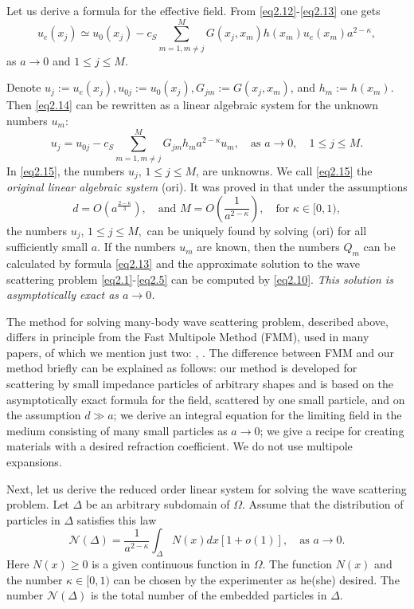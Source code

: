 \documentclass[12pt]{elsarticle}
\numberwithin{equation}{section}
\newcommand{\be}{\begin{equation}}
\newcommand{\ee}{\end{equation}}
\begin{document}
Let us derive a formula for the effective field. From \eqref{eq2.12}-\eqref{eq2.13} one gets
\be \label{eq2.14}
    u_e(x_j) \simeq u_0(x_j)-c_S\sum_{m=1, m \neq j}^M G(x_j,x_m)h(x_m)u_e(x_m)a^{2-\kappa},
\ee
as $a \to 0$ and $1 \leq j \leq M$.

Denote $u_j:=u_e(x_j),  u_{0j}:=u_0(x_j), G_{jm}:=G(x_j,x_m)$, and $h_m:=h(x_m)$. Then \eqref{eq2.14} can be rewritten as
a linear algebraic system for the unknown numbers $u_m$:
\be \label{eq2.15}
    u_j = u_{0j}-c_S\sum_{m=1, m \neq j}^M G_{jm} h_m a^{2-\kappa} u_m, \quad\text{as } a \to 0, \quad 1 \leq j \leq M.
\ee
In \eqref{eq2.15}, the numbers $u_j$, $1 \le j \le M$, are unknowns. We call \eqref{eq2.15} the  \textit{original linear algebraic system} (ori). It was proved in \citet{R635} that under the assumptions
\be \label{eq2.16}
    d=O\left(a^{\frac{2-\kappa}{3}}\right), \quad\text{and } M=O\left(\frac{1}{a^{2-\kappa}}\right), \quad\text{for } \kappa \in [0,1),
\ee
the numbers $u_j$, $1 \leq j \leq M,$ can be uniquely found by solving (ori) for all sufficiently small $a$. If the numbers $u_m$ are known,
then the numbers $Q_m$ can be calculated by formula \eqref{eq2.13} and the approximate solution to the wave scattering problem \eqref{eq2.1}-\eqref{eq2.5} can be computed by \eqref{eq2.10}. {\em This solution is asymptotically exact as $a \to 0$.}

The method for solving many-body wave scattering problem, described above, differs in principle from the 
Fast Multipole Method (FMM), used in many papers, of which we mention just two: \cite{GR1987}, \cite{GR1997}.
The difference between FMM and our method briefly can be explained as follows: our method is developed
for scattering by small impedance particles of arbitrary shapes and is based on the asymptotically exact
formula for the field, scattered by one small particle, and on the assumption $d \gg a$; we derive
an integral equation for the limiting field in the medium consisting of many small particles as $a\to 0$;
we give a recipe for creating materials with a desired refraction coefficient. 
We do not use multipole expansions.

Next, let us derive the reduced order linear system for solving the wave scattering problem. Let $\Delta$ be an arbitrary subdomain of $\Omega$. Assume that the distribution of particles in $\Delta$ satisfies this law
\be \label{eq2.17}
    \mathcal{N}(\Delta)=\frac{1}{a^{2-\kappa}} \int_{\Delta} N(x)dx[1+o(1)], \quad\text{as } a \to 0.
\ee
Here $N(x) \ge 0$ is a given continuous function in $\Omega$. The function  $N(x)$ and the number $\kappa\in [0,1)$ can be chosen
by the experimenter as he(she) desired. The number $\mathcal{N}(\Delta)$ is the total number of the embedded particles in $\Delta$.
\end{document}
